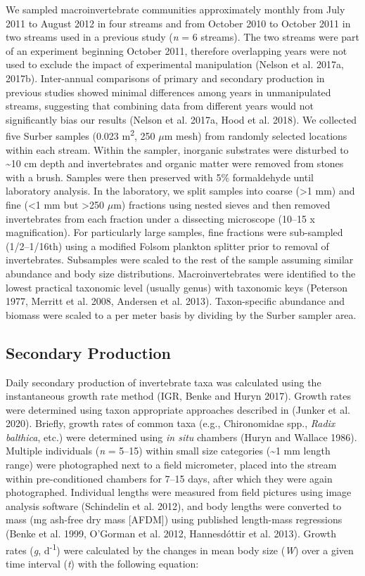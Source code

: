 \documentclass[
]{article}
\begin{document}
We sampled macroinvertebrate communities approximately monthly from July
2011 to August 2012 in four streams and from October 2010 to October
2011 in two streams used in a previous study (\emph{n} = 6 streams). The
two streams were part of an experiment beginning October 2011, therefore
overlapping years were not used to exclude the impact of experimental
manipulation (Nelson et al. 2017a, 2017b). Inter-annual comparisons of
primary and secondary production in previous studies showed minimal
differences among years in unmanipulated streams, suggesting that
combining data from different years would not significantly bias our
results (Nelson et al. 2017a, Hood et al. 2018). We collected five
Surber samples (0.023 m\textsuperscript{2}, 250 \(\mu\)m mesh) from
randomly selected locations within each stream. Within the sampler,
inorganic substrates were disturbed to \textasciitilde10 cm depth and
invertebrates and organic matter were removed from stones with a brush.
Samples were then preserved with 5\% formaldehyde until laboratory
analysis. In the laboratory, we split samples into coarse (\textgreater1
mm) and fine (\textless1 mm but \textgreater250 \(\mu\)m) fractions
using nested sieves and then removed invertebrates from each fraction
under a dissecting microscope (10--15 x magnification). For particularly
large samples, fine fractions were sub-sampled (1/2--1/16th) using a
modified Folsom plankton splitter prior to removal of invertebrates.
Subsamples were scaled to the rest of the sample assuming similar
abundance and body size distributions. Macroinvertebrates were
identified to the lowest practical taxonomic level (usually genus) with
taxonomic keys (Peterson 1977, Merritt et al. 2008, Andersen et al.
2013). Taxon-specific abundance and biomass were scaled to a per meter
basis by dividing by the Surber sampler area.

\hypertarget{secondary-production}{%
\subsection{Secondary Production}\label{secondary-production}}

Daily secondary production of invertebrate taxa was calculated using the
instantaneous growth rate method (IGR, Benke and Huryn 2017). Growth
rates were determined using taxon appropriate approaches described in
(Junker et al. 2020). Briefly, growth rates of common taxa (e.g.,
Chironomidae spp., \emph{Radix balthica}, etc.) were determined using
\emph{in situ} chambers (Huryn and Wallace 1986). Multiple individuals
(\emph{n} = 5--15) within small size categories (\textasciitilde1 mm
length range) were photographed next to a field micrometer, placed into
the stream within pre-conditioned chambers for 7--15 days, after which
they were again photographed. Individual lengths were measured from
field pictures using image analysis software (Schindelin et al. 2012),
and body lengths were converted to mass (mg ash-free dry mass
{[}AFDM{]}) using published length-mass regressions (Benke et al. 1999,
O'Gorman et al. 2012, Hannesdóttir et al. 2013). Growth rates (\emph{g},
d\textsuperscript{-1}) were calculated by the changes in mean body size
(\emph{W}) over a given time interval (\emph{t}) with the following
equation:
\end{document}
